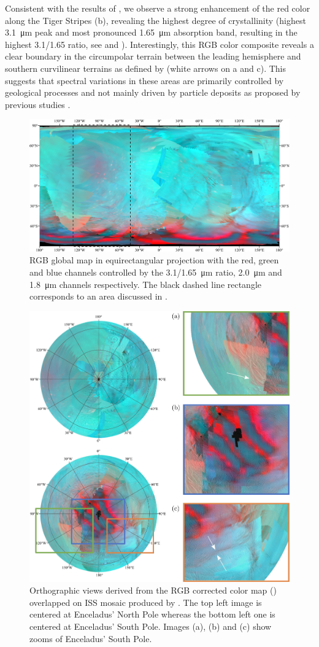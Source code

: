 \documentclass{arxiv-icarus}
\begin{document}
Consistent with the results of \cite{Brown2006}, we observe a strong enhancement of the red color along the Tiger Stripes (b), revealing the highest degree of crystallinity (highest \SI{3.1}{\um} peak and most pronounced \SI{1.65}{\um} absorption band, resulting in the highest \num{3.1/1.65} ratio, see  and ). Interestingly, this RGB color composite reveals a clear boundary in the circumpolar terrain between the leading hemisphere and southern curvilinear terrains as defined by \cite{Crow-Willard2015} (white arrows on a and c). This suggests that spectral variations in these areas are primarily controlled by geological processes and not mainly driven by particle deposits as proposed by previous studies \citep{Schenk2011, Scipioni2017}.


\begin{figure}[!ht]
    \vspace{.2cm}
    \includegraphics[width=.78\linewidth]{Fig_10}
    \caption{RGB global map in equirectangular projection with the red, green and blue channels controlled by the \SI{3.1/1.65}{\um} ratio, \SI{2.0}{\um} and \SI{1.8}{\um} channels respectively. The black dashed line rectangle corresponds to an area discussed in .}
    \label{fig:fig_10}
\end{figure}

\begin{figure}[!ht]
    \includegraphics[width=.65\linewidth]{Fig_11}
    \caption{Orthographic views derived from the RGB corrected color map () overlapped on ISS mosaic produced by \cite{Bland2018}. The top left image is centered at Enceladus' North Pole whereas the bottom left one is centered at Enceladus' South Pole. Images (a), (b) and (c) show zooms of Enceladus' South Pole.}
    \label{fig:fig_11}
\end{figure}
\end{document}
